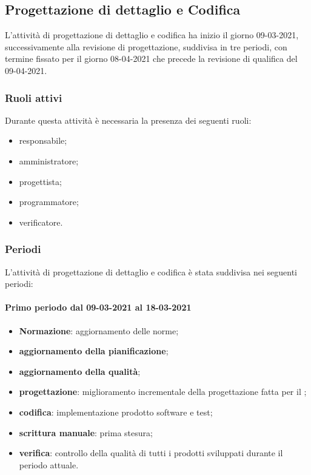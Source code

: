 \newpage	 

\subsection{Progettazione di dettaglio e Codifica} 
L'attività di progettazione di dettaglio e codifica ha inizio il giorno 09-03-2021, successivamente alla 
revisione di progettazione, suddivisa in tre periodi, con termine fissato per il giorno 08-04-2021 
che precede la revisione di qualifica del 09-04-2021. 

\subsubsection{Ruoli attivi} 
Durante questa attività è necessaria la presenza dei seguenti ruoli: 
\begin{itemize} 
	\item responsabile; 
	\item amministratore; 
	\item progettista; 
	\item programmatore; 
	\item verificatore.
\end{itemize} 

\subsubsection{Periodi} 
L'attività di progettazione di dettaglio e codifica è stata suddivisa nei seguenti periodi: 
\paragraph{Primo periodo dal 09-03-2021 al 18-03-2021} 
\begin{itemize} 
	\item \textbf{Normazione}: aggiornamento delle norme; 
	\item \textbf{aggiornamento della pianificazione}; 
	\item \textbf{aggiornamento della qualità}; 
	\item \textbf{progettazione}: miglioramento incrementale della progettazione fatta per il ; 
	\item \textbf{codifica}: implementazione prodotto software e test; 
	\item \textbf{scrittura manuale}: prima stesura; 
	\item \textbf{verifica}: controllo della qualità di tutti i prodotti sviluppati durante il periodo attuale. 
\end{itemize} 

